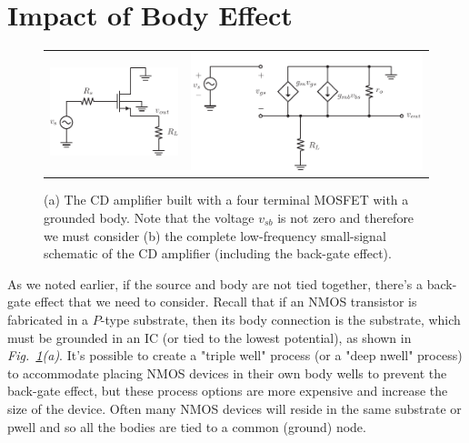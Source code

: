 \section{Impact of Body Effect}
\begin{figure}[tb]
\centering
\begin{tabular}{cc}
\includegraphics[scale=1]{cd_amp_ac_body} &
\includegraphics[scale=.8]{cd_amp_ss_av_body 2}
\end{tabular}
\caption{(a) The CD amplifier built with a four terminal MOSFET with a grounded body.  Note that the voltage $v_{sb}$ is not zero and therefore we must consider (b) the complete low-frequency small-signal schematic of the CD amplifier (including the back-gate effect).}
\label{fig:cd_amp_ac_body}
\end{figure}
As we noted earlier, if the source and body are not tied together, there's a back-gate effect that we need to consider.  Recall that if an NMOS transistor is fabricated in a $P$-type substrate, then its body connection is the substrate, which must be grounded in an IC (or tied to the lowest potential), as shown in \emph{Fig.~\ref{fig:cd_amp_ac_body}(a)}.  It's possible to create a "triple well" process (or a "deep nwell" process) to accommodate placing NMOS devices in their own body wells to prevent the back-gate effect, but these process options are more expensive and increase the size of the device.  Often many NMOS devices will reside in the same substrate or pwell and so all the bodies are tied to a common (ground) node.
